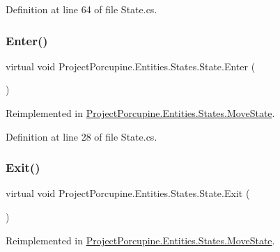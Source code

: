 Definition at line 64 of file State.\+cs.

\mbox{\label{class_project_porcupine_1_1_entities_1_1_states_1_1_state_a1e1ee50555cfa4eb75d52876015b54c1}} 
\subsubsection{\texorpdfstring{Enter()}{Enter()}}
{\footnotesize\ttfamily virtual void Project\+Porcupine.\+Entities.\+States.\+State.\+Enter (\begin{DoxyParamCaption}{ }\end{DoxyParamCaption})\hspace{0.3cm}{\ttfamily [virtual]}}



Reimplemented in \hyperlink{class_project_porcupine_1_1_entities_1_1_states_1_1_move_state_ae2cbe17dbccd0db23e01f7734a0f7b8f}{Project\+Porcupine.\+Entities.\+States.\+Move\+State}.



Definition at line 28 of file State.\+cs.

\mbox{\label{class_project_porcupine_1_1_entities_1_1_states_1_1_state_aed1e6db379e98e447596fc72a69eec0c}} 
\subsubsection{\texorpdfstring{Exit()}{Exit()}}
{\footnotesize\ttfamily virtual void Project\+Porcupine.\+Entities.\+States.\+State.\+Exit (\begin{DoxyParamCaption}{ }\end{DoxyParamCaption})\hspace{0.3cm}{\ttfamily [virtual]}}



Reimplemented in \hyperlink{class_project_porcupine_1_1_entities_1_1_states_1_1_move_state_a5b379c83e83f2db29c338f0babc3994e}{Project\+Porcupine.\+Entities.\+States.\+Move\+State}.



